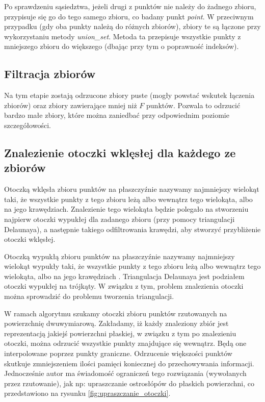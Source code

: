 Po sprawdzeniu sąsiedztwa, jeżeli drugi z punktów nie należy do żadnego zbioru, przypisuje się go do tego samego zbioru, co badany punkt \textit{point}.
W przeciwnym przypadku (gdy oba punkty należą do różnych zbiorów), zbiory te są łączone przy wykorzystaniu metody \textit{union\_set}.
Metoda ta przepisuje wszystkie punkty z mniejszego zbioru do większego (dbając przy tym o poprawność indeksów).

\subsection{Filtracja zbiorów}

Na tym etapie zostają odrzucone zbiory puste (mogły powstać wskutek łączenia zbiorów) oraz zbiory zawierające
mniej niż $F$ punktów. Pozwala to odrzucić bardzo małe zbiory, które można zaniedbać przy odpowiednim
poziomie szczegółowości.

\subsection{Znalezienie otoczki wklęsłej dla każdego ze zbiorów}
\label{chap:upraszczanie}

Otoczką wklęsła zbioru punktów na płaszczyźnie nazywamy najmniejszy wielokąt taki, że wszystkie punkty z tego
zbioru leżą albo wewnątrz tego wielokąta, albo na jego krawędziach. Znalezienie tego wielokąta będzie polegało na
stworzeniu najpierw otoczki wypukłej dla zadanego zbioru (przy pomocy triangulacji Delaunaya), a następnie takiego
odfiltrowania krawędzi, aby stworzyć przybliżenie otoczki wklęsłej.

Otoczką wypukłą zbioru punktów na płaszczyźnie nazywamy najmniejszy wielokąt wypukły taki, że wszystkie punkty z tego
zbioru leżą albo wewnątrz tego wielokąta, albo na jego krawędziach \cite{website:OtoczkaTriangulacja}.
Triangulacja Delaunaya jest podziałem otoczki wypukłej na trójkąty. W związku z tym, problem znalezienia otoczki
można sprowadzić do problemu tworzenia triangulacji.

W ramach algorytmu szukamy otoczki zbioru punktów rzutowanych na powierzchnię dwuwymiarową.
Zakładamy, iż każdy znaleziony zbiór jest reprezentacją jakiejś powierzchni płaskiej,
w związku z tym po znalezieniu otoczki, można odrzucić wszystkie punkty znajdujące się wewnątrz.
Będą one interpolowane poprzez punkty graniczne.
Odrzucenie większości punktów skutkuje zmniejszeniem ilości pamięci koniecznej do przechowywania informacji. Jednocześnie autor ma
świadomość ograniczeń tego rozwiązania (wywołanych przez rzutowanie), jak np: upraszczanie ostrosłópów do płaskich powierzchni, co przedstawiono
na rysunku \ref{fig:upraszczanie_otoczki}.

